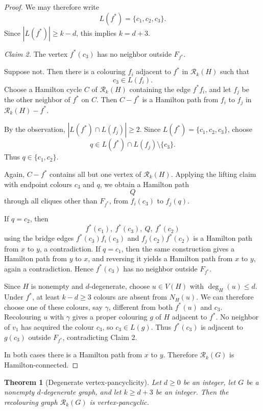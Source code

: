 \documentclass[11pt]{article}
\newtheorem{theorem}{Theorem}[section]
\theoremstyle{remark}
\newcommand{\Rk}{\mathcal R_k}
\numberwithin{equation}{section}
\begin{document}
\begin{proof}
We may therefore write
\[
L(f^\ast)=\{c_1,c_2,c_3\}.
\]
Since $|L(f^\ast)|\geq k-d$, this implies $k=d+3$.

\smallskip

\noindent\textit{Claim 2.} The vertex $f^\ast(c_3)$ has no neighbor outside $F_{f^\ast}$.

Suppose not. Then there is a colouring $f_i$ adjacent to $f^\ast$ in $\Rk(H)$ such that
\[
c_3\in L(f_i).
\]
Choose a Hamilton cycle $C$ of $\Rk(H)$ containing the edge $f^\ast f_i$, and let $f_j$ be the other neighbor of $f^\ast$ on $C$. Then $C-f^\ast$ is a Hamilton path from $f_i$ to $f_j$ in $\Rk(H)-f^\ast$.

By the observation, $|L(f^\ast)\cap L(f_j)|\geq 2$. Since $L(f^\ast)=\{c_1,c_2,c_3\}$, choose
\[
q\in L(f^\ast)\cap L(f_j)\setminus\{c_3\}.
\]
Thus $q\in\{c_1,c_2\}$.

Again, $C-f^\ast$ contains all but one vertex of $\Rk(H)$.
Applying the lifting claim with endpoint colours $c_3$ and $q$, we
obtain a Hamilton path
\[
Q
\]
through all cliques other than $F_{f^\ast}$, from $f_i(c_3)$ to $f_j(q)$.

If $q=c_2$, then
\[
f^\ast(c_1),\ f^\ast(c_3),\ Q,\ f^\ast(c_2)
\]
using the bridge edges $f^\ast(c_3)f_i(c_3)$ and $f_j(c_2)f^\ast(c_2)$ is a Hamilton path from $x$ to $y$, a contradiction. If $q=c_1$, then the same construction gives a Hamilton path from $y$ to $x$, and reversing it yields a Hamilton path from $x$ to $y$, again a contradiction. Hence $f^\ast(c_3)$ has no neighbor outside $F_{f^\ast}$.

Since $H$ is nonempty and $d$-degenerate, choose $u\in V(H)$ with
$\deg_H(u)\le d$. Under $f^\ast$, at least $k-d\ge3$ colours are
absent from $N_H(u)$. We can therefore choose one of these colours,
say $\gamma$, different from both $f^\ast(u)$ and $c_3$.
Recolouring $u$ with $\gamma$ gives a proper colouring $g$ of $H$
adjacent to $f^\ast$. No neighbor of $v_1$ has acquired the colour
$c_3$, so $c_3\in L(g)$. Thus $f^\ast(c_3)$ is adjacent to
$g(c_3)$ outside $F_{f^\ast}$, contradicting Claim 2.

In both cases there is a Hamilton path from $x$ to $y$. Therefore $\Rk(G)$ is Hamilton-connected.
\end{proof}

\begin{theorem}[Degenerate vertex-pancyclicity]\label{thm:degenerate-vp}
Let $d\ge0$ be an integer, let $G$ be a nonempty $d$-degenerate graph,
and let $k\ge d+3$ be an integer.
Then the recolouring graph $\Rk(G)$ is vertex-pancyclic.

\end{theorem}
\end{document}
